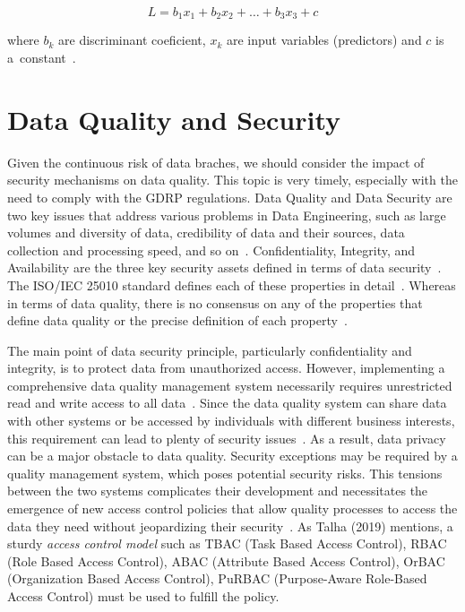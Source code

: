 \begin{equation*}
    L = b_1 x_1 + b_2 x_2 + \ldots + b_3 x_3 + c
\end{equation*}

where \( b_k \) are discriminant coeficient, \( x_k \) are input variables (predictors) and \( c \) is a~constant~\cite{batini2007}.

\section{Data Quality and Security}\label{sec:data-quality-and-security}

Given the continuous risk of data braches, we should consider the impact of security mechanisms on data quality.
This topic is very timely, especially with the need to comply with the GDRP regulations.
Data Quality and Data Security are two key issues that address various problems in Data Engineering, such as large volumes and diversity of data, credibility of data and their sources, data collection and processing speed, and so on~\cite{talha2019}.
Confidentiality, Integrity, and Availability are the three key security assets defined in terms of data security~\cite{talha2019}.
The ISO/IEC 25010 standard defines each of these properties in detail~\cite{iso25010}.
Whereas in terms of data quality, there is no consensus on any of the properties that define data quality or the precise definition of each property~\cite{batini2009}.

The main point of data security principle, particularly confidentiality and integrity, is to protect data from unauthorized access.
However, implementing a comprehensive data quality management system necessarily requires unrestricted read and write access to all data~\cite{talha2019}.
Since the data quality system can share data with other systems or be accessed by individuals with different business interests, this requirement can lead to plenty of security issues~\cite{talha2019}.
As a result, data privacy can be a major obstacle to data quality.
Security exceptions may be required by a quality management system, which poses potential security risks.
This tensions between the two systems complicates their development and necessitates the emergence of new access control policies that allow quality processes to access the data they need without jeopardizing their security~\cite{talha2019}.
As Talha (2019) mentions, a sturdy \textit{access control model} such as TBAC (Task Based Access Control), RBAC (Role Based Access Control), ABAC (Attribute Based Access Control), OrBAC (Organization Based Access Control), PuRBAC (Purpose-Aware Role-Based Access Control) must be used to fulfill the policy.

